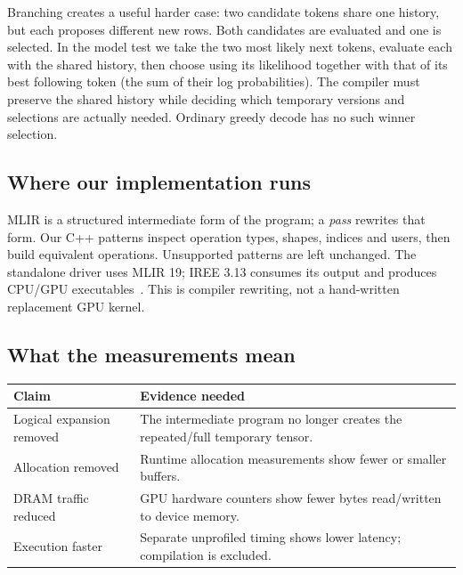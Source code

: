 \documentclass[10pt,a4paper]{article}
\newcommand{\code}[1]{\texttt{#1}}
\begin{document}
Branching creates a useful harder case: two candidate tokens share one history, but each proposes different new rows. Both candidates are evaluated and one is selected. In the model test we take the two most likely next tokens, evaluate each with the shared history, then choose using its likelihood together with that of its best following token (the sum of their log probabilities). The compiler must preserve the shared history while deciding which temporary versions and selections are actually needed. Ordinary greedy decode has no such winner selection.

\subsection*{Where our implementation runs}
\begin{center}
\end{center}
MLIR is a structured intermediate form of the program; a \emph{pass} rewrites that form. Our C++ patterns inspect operation types, shapes, indices and users, then build equivalent operations. Unsupported patterns are left unchanged. The standalone driver uses MLIR 19; IREE 3.13 consumes its output and produces CPU/GPU executables~\cite{mlir,project}. This is compiler rewriting, not a hand-written replacement GPU kernel.

\subsection*{What the measurements mean}
{\small\begin{tabularx}{\linewidth}{@{}P{31mm}Y@{}}\toprule
\textbf{Claim} & \textbf{Evidence needed}\\\midrule
Logical expansion removed & The intermediate program no longer creates the repeated/full temporary tensor.\\
Allocation removed & Runtime allocation measurements show fewer or smaller buffers.\\
DRAM traffic reduced & GPU hardware counters show fewer bytes read/written to device memory.\\
Execution faster & Separate unprofiled timing shows lower latency; compilation is excluded.\\\bottomrule
\end{tabularx}}
\end{document}
